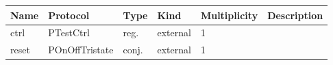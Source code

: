 

\begin{tabular}[ht]{|l|l|l|l|l|p{5cm}|}
\hline
\textbf{Name} & \textbf{Protocol} & \textbf{Type} & \textbf{Kind} & \textbf{Multiplicity} & \textbf{Description}\\
\hline
ctrl & PTestCtrl & reg. & external & 1 & \\
\hline
reset & POnOffTristate & conj. & external & 1 & \\
\hline
\end{tabular}


\begin{par}

\end{par}


\begin{par}

\end{par}
	



